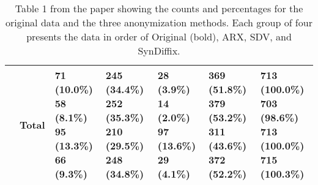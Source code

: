 \begin{table}
\begin{center}
\begin{small}
\begin{tabular}{lllllll}
& Total      & \makecell[l]{\textbf{71 (10.0\%)} \\58 (8.1\%) \\95 (13.3\%) \\66 (9.3\%) \\}      & \makecell[l]{\textbf{245 (34.4\%)} \\252 (35.3\%) \\210 (29.5\%) \\248 (34.8\%) \\}      & \makecell[l]{\textbf{28 (3.9\%)} \\14 (2.0\%) \\97 (13.6\%) \\29 (4.1\%) \\}      & \makecell[l]{\textbf{369 (51.8\%)} \\379 (53.2\%) \\311 (43.6\%) \\372 (52.2\%) \\}      & \makecell[l]{\textbf{713 (100.0\%)} \\703 (98.6\%)  \\713 (100.0\%)  \\715 (100.3\%)  \\} \\ 

      \bottomrule
      \end{tabular}
      \end{small}
      \caption{Table 1 from the paper showing the counts and percentages for the original data and the three anonymization methods. Each group of four presents the data in order of Original (bold), ARX, SDV, and SynDiffix.}
      \label{tab:table1}
      \end{center}
      \end{table}
      \setlength{\fboxsep}{3pt}
    